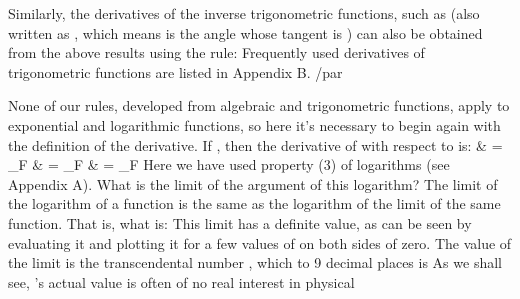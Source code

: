 {{%
%
Similarly, the derivatives of the inverse trigonometric functions, such as
 (also written as , which means \m{\theta} is
the angle whose tangent is ) can also be obtained from the above results
using the rule:
%
%
Frequently used derivatives of trigonometric functions are listed in
Appendix B.} /par
%
\par{None of our rules, developed from algebraic and trigonometric functions,
apply to exponential and logarithmic functions, so here it's necessary to
begin again with the definition of the derivative.
If , then the derivative of  with respect to  is:
%
 { & = \lim_{\Delta F}}
 { & = \lim_{\Delta F}}
 { & = \lim_{\Delta F}}
%
Here we have used property (3) of logarithms (see Appendix A).
What is the limit of the argument of this logarithm?
%
%
{The limit of the logarithm of a function is the same as the logarithm of
 the limit of the same function.
}
%
That is, what is:
%
%
This limit has a definite value, as can be seen by evaluating it and
plotting it for a few values of  on both sides of zero.
%
%
The value of the limit is the transcendental number , which to 9 decimal
places is
%
%
As we shall see, 's actual value is often of no real interest in physical
}}

